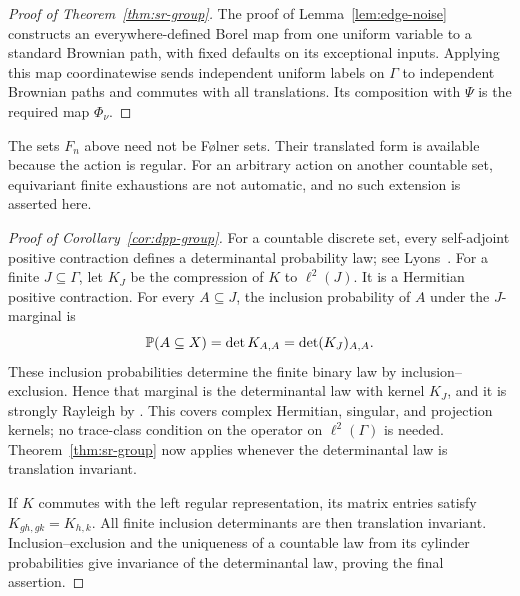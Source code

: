 \begin{proof}[Proof of Theorem~\ref{thm:sr-group}]
The proof of Lemma~\ref{lem:edge-noise} constructs an everywhere-defined
Borel map from one uniform variable to a standard Brownian path, with fixed
defaults on its exceptional inputs. Applying this map coordinatewise
sends independent uniform labels on $\Gamma$ to independent Brownian paths
and commutes with all translations. Its composition with $\Psi$ is the
required map $\Phi_\nu$.
\end{proof}

The sets $F_n$ above need not be F\o lner sets. Their translated form is
available because the action is regular. For an arbitrary action on another
countable set, equivariant finite exhaustions are not automatic, and no
such extension is asserted here.

\begin{proof}[Proof of Corollary~\ref{cor:dpp-group}]
For a countable discrete set, every self-adjoint positive contraction
defines a determinantal probability law; see Lyons~\cite[Section~8]{Lyons2003}.
For a finite $J\subseteq\Gamma$, let $K_J$ be the compression of $K$ to
$\ell^2(J)$. It is a Hermitian positive contraction. For every $A\subseteq J$,
the inclusion probability of $A$ under the $J$-marginal is
\[
 \P(A\subseteq X)=\det K_{A,A}=\det (K_J)_{A,A}.
\]
These inclusion probabilities determine the finite binary law by
inclusion--exclusion. Hence that marginal is the determinantal law with
kernel $K_J$, and it is strongly Rayleigh by
\cite[Proposition~3.5]{BorceaBrandenLiggett2009}. This covers complex
Hermitian, singular, and projection kernels; no trace-class condition on
the operator on $\ell^2(\Gamma)$ is needed. Theorem~\ref{thm:sr-group}
now applies whenever the determinantal law is translation invariant.

If $K$ commutes with the left regular representation, its matrix entries
satisfy $K_{gh,gk}=K_{h,k}$. All finite inclusion determinants are then
translation invariant. Inclusion--exclusion and the uniqueness of a
countable law from its cylinder probabilities give invariance of the
determinantal law, proving the final assertion.
\end{proof}
